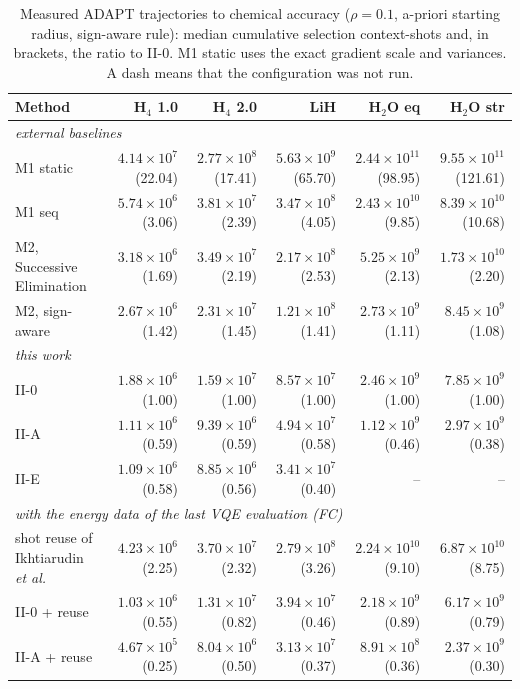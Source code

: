 \documentclass[aps,pra,reprint,superscriptaddress,nofootinbib]{revtex4-2}
\begin{document}
\begin{table}[!htb]
\centering\small
\caption{Measured ADAPT trajectories to chemical accuracy ($\rho=0.1$, a-priori starting radius, sign-aware rule): median cumulative selection context-shots and, in brackets, the ratio to II-0. M1 static uses the exact gradient scale and variances. A dash means that the configuration was not run.}
\label{tab:q8traj}
\footnotesize\setlength{\tabcolsep}{4pt}
\begin{tabular}{lrrrrr}
\toprule
Method & H$_4$ 1.0 & H$_4$ 2.0 & LiH & H$_2$O eq & H$_2$O str \\
\midrule
\multicolumn{6}{l}{\emph{external baselines}} \\
M1 static & $4.14\times10^{7}$ (22.04) & $2.77\times10^{8}$ (17.41) & $5.63\times10^{9}$ (65.70) & $2.44\times10^{11}$ (98.95) & $9.55\times10^{11}$ (121.61) \\
M1 seq & $5.74\times10^{6}$ (3.06) & $3.81\times10^{7}$ (2.39) & $3.47\times10^{8}$ (4.05) & $2.43\times10^{10}$ (9.85) & $8.39\times10^{10}$ (10.68) \\
M2, Successive Elimination & $3.18\times10^{6}$ (1.69) & $3.49\times10^{7}$ (2.19) & $2.17\times10^{8}$ (2.53) & $5.25\times10^{9}$ (2.13) & $1.73\times10^{10}$ (2.20) \\
M2, sign-aware & $2.67\times10^{6}$ (1.42) & $2.31\times10^{7}$ (1.45) & $1.21\times10^{8}$ (1.41) & $2.73\times10^{9}$ (1.11) & $8.45\times10^{9}$ (1.08) \\
\multicolumn{6}{l}{\emph{this work}} \\
II-0 & $1.88\times10^{6}$ (1.00) & $1.59\times10^{7}$ (1.00) & $8.57\times10^{7}$ (1.00) & $2.46\times10^{9}$ (1.00) & $7.85\times10^{9}$ (1.00) \\
II-A & $1.11\times10^{6}$ (0.59) & $9.39\times10^{6}$ (0.59) & $4.94\times10^{7}$ (0.58) & $1.12\times10^{9}$ (0.46) & $2.97\times10^{9}$ (0.38) \\
II-E & $1.09\times10^{6}$ (0.58) & $8.85\times10^{6}$ (0.56) & $3.41\times10^{7}$ (0.40) & -- & -- \\
\multicolumn{6}{l}{\emph{with the energy data of the last VQE evaluation (FC)}} \\
shot reuse of Ikhtiarudin \textit{et al.} & $4.23\times10^{6}$ (2.25) & $3.70\times10^{7}$ (2.32) & $2.79\times10^{8}$ (3.26) & $2.24\times10^{10}$ (9.10) & $6.87\times10^{10}$ (8.75) \\
II-0 + reuse & $1.03\times10^{6}$ (0.55) & $1.31\times10^{7}$ (0.82) & $3.94\times10^{7}$ (0.46) & $2.18\times10^{9}$ (0.89) & $6.17\times10^{9}$ (0.79) \\
II-A + reuse & $4.67\times10^{5}$ (0.25) & $8.04\times10^{6}$ (0.50) & $3.13\times10^{7}$ (0.37) & $8.91\times10^{8}$ (0.36) & $2.37\times10^{9}$ (0.30) \\
\bottomrule
\end{tabular}
\end{table}
\end{document}

